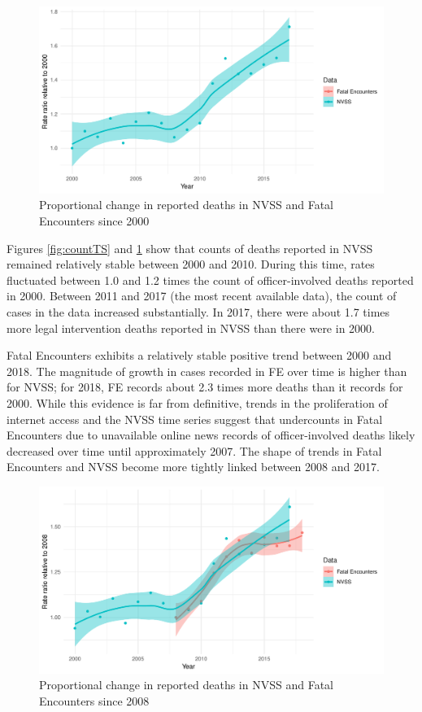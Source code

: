 \documentclass{article}
\begin{document}
\begin{figure}
	\centering
	\includegraphics[width = \linewidth]{vis/nvss_fe_pct.pdf}
	\caption{Proportional change in reported deaths in NVSS and Fatal Encounters since 2000}
	\label{fig:pctTS}
\end{figure}

Figures \ref{fig:countTS} and \ref{fig:pctTS} show that counts of deaths reported in NVSS remained relatively stable between 2000 and 2010. During this time, rates fluctuated between 1.0 and 1.2 times the count of officer-involved deaths reported in 2000. Between 2011 and 2017 (the most recent available data), the count of cases in the data increased substantially. In 2017, there were about 1.7 times more legal intervention deaths reported in NVSS than there were in 2000. 

Fatal Encounters exhibits a relatively stable positive trend between 2000 and 2018. The magnitude of growth in cases recorded in FE over time is higher than for NVSS; for 2018, FE records about 2.3 times more deaths than it records for 2000. While this evidence is far from definitive, trends in the proliferation of internet access and the NVSS time series suggest that undercounts in Fatal Encounters due to unavailable online news records of officer-involved deaths likely decreased over time until approximately 2007. The shape of trends in Fatal Encounters and NVSS become more tightly linked between 2008 and 2017. 

\begin{figure}[H]
	\centering
	\includegraphics[width = \linewidth]{vis/nvss_fe_pct_08.pdf}
	\caption{Proportional change in reported deaths in NVSS and Fatal Encounters since 2008}
	\label{fig:pct_08}
\end{figure}
\end{document}
